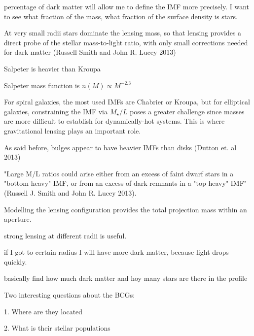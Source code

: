 percentage of dark matter will allow me to define the IMF more precisely. I want to see what fraction of the mass, what fraction of the surface density is stars. 

At very small radii stars dominate the lensing mass, so that lensing provides a direct probe of the stellar mass-to-light ratio, with only small corrections needed for dark matter (Russell Smith and John R. Lucey 2013)

Salpeter is heavier than Kroupa 

Salpeter mass function is $n(M)\propto M^{-2.3}$ 

For spiral galaxies, the most used IMFs are Chabrier or Kroupa, but for elliptical galaxies, constraining the IMF via $M_{\star}/L$ poses a greater challenge since masses are more difficult to establish for dynamically-hot systems. This is where gravitational lensing plays an important role.

As said before, bulges appear to have heavier IMFs than disks (Dutton et. al 2013)

"Large M/L ratios could arise either from an excess of faint dwarf stars in a "bottom heavy" IMF, or from an excess of dark remnants in a "top heavy" IMF" (Russell J. Smith and John R. Lucey 2013).

Modelling the lensing configuration provides the total projection mass within an aperture.

strong lensing at different radii is useful.

if I got to certain radius I will have more dark matter, because light drops quickly. 

basically find how much dark matter and hoy many stars are there in the profile

Two interesting questions about the BCGs:

1. Where are they located

2. What is their stellar populations


\newpage
